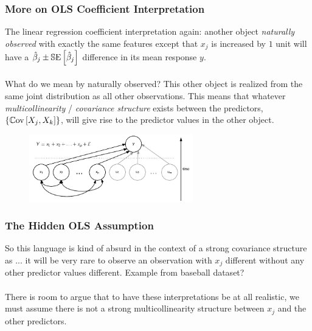 \documentclass[handout]{beamer}
\begin{document}
\begin{frame}\frametitle{More on OLS Coefficient Interpretation}

\small
The linear regression coefficient interpretation again: another object \emph{naturally observed} with exactly the same features except that $x_j$ is increased by $1$ unit will have a $\hat{\beta}_j \pm \mathbb{S}\text{E}\left[\hat{\beta}_j\right]$ difference in its mean response $y$.\\~\\

What do we mean by naturally observed? \pause This other object is realized from the same joint distribution as all other observations. This means that whatever \textit{multicollinearity} / \textit{covariance structure} exists between the predictors, $\left\{\mathbb{C}\text{ov}\left[X_j, X_k\right]\right\}$, will give rise to the predictor values in the other object.
	
\begin{figure}
\centering
\includegraphics[width=2.8in]{predictor_covariance_structure}
\end{figure}

\end{frame}

\begin{frame}\frametitle{The Hidden  OLS Assumption}

So this language  is kind of absurd in the context of a strong covariance structure as ... \pause it will be very rare to observe an observation with $x_j$ different without any other predictor values different. \pause Example from baseball dataset? \\~\\

There is room to argue that to have these interpretations be at all realistic, we must assume there is not a strong multicollinearity structure between $x_j$ and the other predictors.
	
\end{frame}
\end{document}
